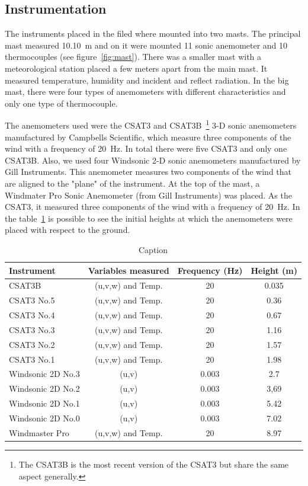 \subsection{Instrumentation} \label{instrumentation}

The instruments placed in the filed where mounted into two masts. The principal mast measured 10.10~m and on it were mounted 11 sonic anemometer and 10 thermocouples (see figure~\ref{fig:mast}). There was a smaller mast with a meteorological station placed a few meters apart from the main mast. It measured temperature, humidity and incident and reflect radiation. In the big mast, there were four types of anemometers with different characteristics and only one type of thermocouple.

The anemometers used were the CSAT3 and CSAT3B~\footnote{The CSAT3B is the most recent version of the CSAT3 but share the same aspect generally.} 3-D sonic anemometers manufactured by Campbells Scientific, which measure three components of the wind with a frequency of 20~Hz. In total there were five CSAT3 and only one CSAT3B. Also, we used four Windsonic 2-D sonic anemometers manufactured by Gill Instruments. This anemometer measures two components of the wind that are aligned to the "plane" of the instrument. At the top of the mast, a Windmater Pro Sonic Anemometer (from Gill Instruments) was placed. As the CSAT3, it measured three components of the wind with a frequency of 20~Hz. In the table~\ref{tab:intruments_anemometers} is possible to see the initial heights at which the anemometers were placed with respect to the ground. 

\begin{table}[!ht]
    \centering
    \begin{tabular}{ | l | c | c | c |}
    \hline
    \textbf{Instrument} & \textbf{Variables measured} &  \textbf{Frequency (Hz)} & \textbf{Height (m)} \\ [0.5ex]  \hline\hline
    CSAT3B & (u,v,w) and Temp. & 20 & 0.035 \\
    \hline
    CSAT3 No.5 & (u,v,w) and Temp. & 20 & 0.36 \\
    \hline
    CSAT3 No.4 & (u,v,w) and Temp. & 20 & 0.67 \\
    \hline
    CSAT3 No.3 & (u,v,w) and Temp. & 20 & 1.16 \\
    \hline
    CSAT3 No.2 & (u,v,w) and Temp. & 20 & 1.57 \\
    \hline
    CSAT3 No.1 & (u,v,w) and Temp. & 20 & 1.98 \\
    \hline
    Windsonic 2D No.3 & (u,v) & 0.003 &  2.7\\
    \hline
    Windsonic 2D No.2 & (u,v) & 0.003 &  3,69\\
    \hline
    Windsonic 2D No.1 & (u,v) & 0.003 &  5.42\\
    \hline
    Windsonic 2D No.0 & (u,v) & 0.003 &  7.02\\
    \hline
    Windmaster Pro & (u,v,w) and Temp. & 20 & 8.97 \\
    \hline
    
    \end{tabular}
    \caption{Caption}
    \label{tab:intruments_anemometers}
\end{table}


